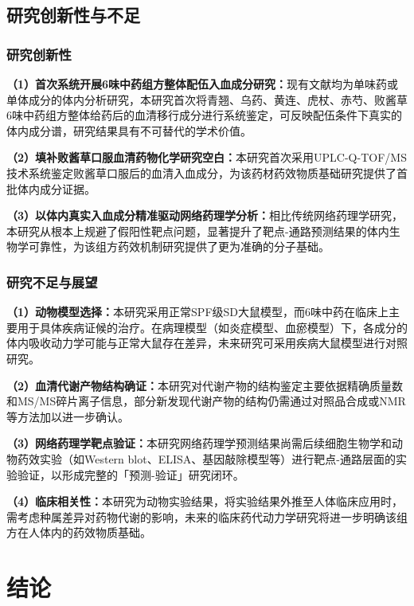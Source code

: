 \documentclass[12pt,a4paper,UTF8,openany]{ctexbook}
\begin{document}
\section{研究创新性与不足}

\subsection{研究创新性}

\textbf{（1）首次系统开展6味中药组方整体配伍入血成分研究：}现有文献均为单味药或单体成分的体内分析研究，本研究首次将青翘、乌药、黄连、虎杖、赤芍、败酱草6味中药组方整体给药后的血清移行成分进行系统鉴定，可反映配伍条件下真实的体内成分谱，研究结果具有不可替代的学术价值。

\textbf{（2）填补败酱草口服血清药物化学研究空白：}本研究首次采用UPLC-Q-TOF/MS技术系统鉴定败酱草口服后的血清入血成分，为该药材药效物质基础研究提供了首批体内成分证据。

\textbf{（3）以体内真实入血成分精准驱动网络药理学分析：}相比传统网络药理学研究，本研究从根本上规避了假阳性靶点问题，显著提升了靶点-通路预测结果的体内生物学可靠性，为该组方药效机制研究提供了更为准确的分子基础。

\subsection{研究不足与展望}

\textbf{（1）动物模型选择：}本研究采用正常SPF级SD大鼠模型，而6味中药在临床上主要用于具体疾病证候的治疗。在病理模型（如炎症模型、血瘀模型）下，各成分的体内吸收动力学可能与正常大鼠存在差异\cite{Dai2017,Yu2010}，未来研究可采用疾病大鼠模型进行对照研究。

\textbf{（2）血清代谢产物结构确证：}本研究对代谢产物的结构鉴定主要依据精确质量数和MS/MS碎片离子信息，部分新发现代谢产物的结构仍需通过对照品合成或NMR等方法加以进一步确认。

\textbf{（3）网络药理学靶点验证：}本研究网络药理学预测结果尚需后续细胞生物学和动物药效实验（如Western blot、ELISA、基因敲除模型等）进行靶点-通路层面的实验验证，以形成完整的「预测-验证」研究闭环。

\textbf{（4）临床相关性：}本研究为动物实验结果，将实验结果外推至人体临床应用时，需考虑种属差异对药物代谢的影响，未来的临床药代动力学研究将进一步明确该组方在人体内的药效物质基础。


\chapter*{结\quad 论}
\end{document}
